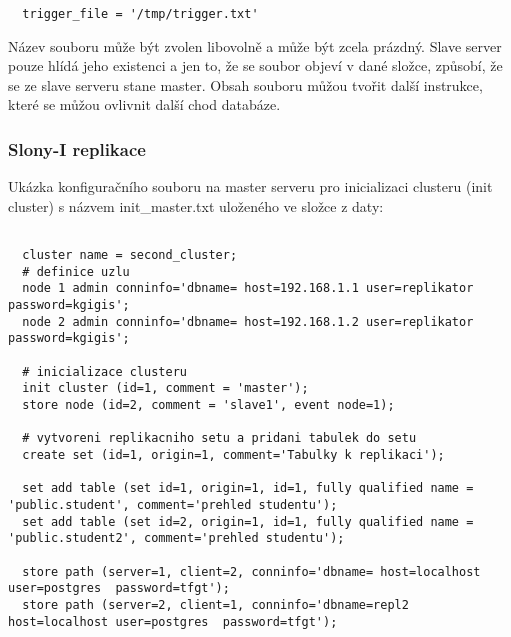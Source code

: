 \begin{lstlisting}
  trigger_file = '/tmp/trigger.txt'
\end{lstlisting}

Název souboru může být zvolen libovolně a může být zcela prázdný. Slave server pouze hlídá jeho existenci a jen to, že se soubor objeví v dané složce, způsobí, že se ze slave serveru stane master. Obsah souboru můžou tvořit další instrukce, které se můžou ovlivnit další chod databáze. 

\subsubsection{Slony-I replikace}

  Ukázka konfiguračního souboru na master serveru pro inicializaci clusteru (init cluster) s názvem init\_master.txt uloženého ve složce z daty:
  \begin{lstlisting}[basicstyle=\footnotesize\ttfamily,identifierstyle=\color{black},stringstyle=\color{black},keywordstyle=\color{black},
  ]

  cluster name = second_cluster;
  # definice uzlu
  node 1 admin conninfo='dbname= host=192.168.1.1 user=replikator password=kgigis';
  node 2 admin conninfo='dbname= host=192.168.1.2 user=replikator password=kgigis';

  # inicializace clusteru
  init cluster (id=1, comment = 'master');
  store node (id=2, comment = 'slave1', event node=1);

  # vytvoreni replikacniho setu a pridani tabulek do setu
  create set (id=1, origin=1, comment='Tabulky k replikaci');

  set add table (set id=1, origin=1, id=1, fully qualified name = 'public.student', comment='prehled studentu');
  set add table (set id=2, origin=1, id=1, fully qualified name = 'public.student2', comment='prehled studentu');

  store path (server=1, client=2, conninfo='dbname= host=localhost user=postgres  password=tfgt');
  store path (server=2, client=1, conninfo='dbname=repl2 host=localhost user=postgres  password=tfgt');

  \end{lstlisting}
